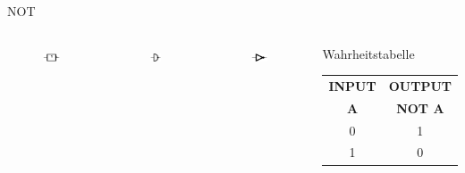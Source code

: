\begin{frame}{NOT}
  \begin{columns}
    \begin{figure}
      \includegraphics[width=\textwidth,height=2em,keepaspectratio]{a14/NOT_IEC.pdf}
    \end{figure}
    \begin{figure}
      \includegraphics[width=\textwidth,height=2em,keepaspectratio]{a14/NOT_DIN.pdf}
    \end{figure}
    \begin{figure}
      \includegraphics[width=\textwidth,height=2em,keepaspectratio]{a14/NOT_ANSI.pdf}
    \end{figure}
    \begin{block}{Wahrheitstabelle}
      \begin{tabular}{c|c}
        \textbf{INPUT} & \textbf{OUTPUT} \\
        \textbf{A} & \textbf{NOT A} \\ \hline
        0 & 1 \\
        1 & 0 \\
      \end{tabular}
    \end{block}
  \end{columns}
\end{frame}

